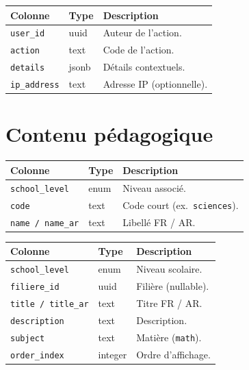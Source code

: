 \begin{longtable}{p{3.6cm}p{2.6cm}p{8cm}}
\toprule \textbf{Colonne} & \textbf{Type} & \textbf{Description} \\ \midrule \endhead
\texttt{user\_id} & uuid & Auteur de l'action. \\
\texttt{action} & text & Code de l'action. \\
\texttt{details} & jsonb & Détails contextuels. \\
\texttt{ip\_address} & text & Adresse IP (optionnelle). \\
\bottomrule
\end{longtable}

\section{Contenu pédagogique}

\begin{longtable}{p{3.6cm}p{2.6cm}p{8cm}}
\toprule \textbf{Colonne} & \textbf{Type} & \textbf{Description} \\ \midrule \endhead
\texttt{school\_level} & enum & Niveau associé. \\
\texttt{code} & text & Code court (ex.\ \texttt{sciences}). \\
\texttt{name / name\_ar} & text & Libellé FR / AR. \\
\bottomrule
\end{longtable}

\begin{longtable}{p{3.6cm}p{2.6cm}p{8cm}}
\toprule \textbf{Colonne} & \textbf{Type} & \textbf{Description} \\ \midrule \endhead
\texttt{school\_level} & enum & Niveau scolaire. \\
\texttt{filiere\_id} & uuid & Filière (nullable). \\
\texttt{title / title\_ar} & text & Titre FR / AR. \\
\texttt{description} & text & Description. \\
\texttt{subject} & text & Matière (\texttt{math}). \\
\texttt{order\_index} & integer & Ordre d'affichage. \\
\bottomrule
\end{longtable}

